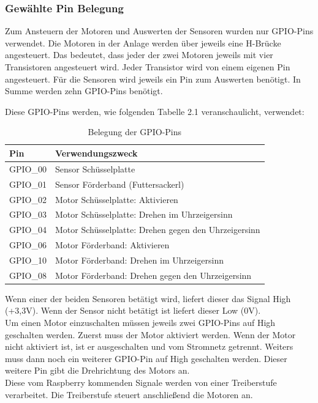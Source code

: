 \vspace{120pt}

\subsubsection{Gewählte Pin Belegung}
Zum Ansteuern der Motoren und Auswerten der Sensoren wurden nur GPIO-Pins verwendet. Die Motoren in der Anlage werden über jeweils eine H-Brücke angesteuert. Das bedeutet, dass jeder der zwei Motoren jeweils mit vier Transistoren angesteuert wird. Jeder Transistor wird von einem eigenen Pin angesteuert. Für die Sensoren wird jeweils ein Pin zum Auswerten benötigt. In Summe werden zehn GPIO-Pins benötigt. 

\newpage

Diese GPIO-Pins werden, wie folgenden Tabelle 2.1 veranschaulicht, verwendet:

\begin{table}[htb]
\centering
\begin{tabular}{|l|l|}
\hline
\textbf{Pin} & \textbf{Verwendungszweck}          \\ \hline
GPIO\_00     & Sensor Schüsselplatte              \\ \hline
GPIO\_01     & Sensor Förderband (Futtersackerl)  \\ \hline
GPIO\_02     & Motor Schüsselplatte: Aktivieren \\ \hline
GPIO\_03     & Motor Schüsselplatte: Drehen im Uhrzeigersinn \\ \hline
GPIO\_04     & Motor Schüsselplatte: Drehen gegen den Uhrzeigersinn \\ \hline
GPIO\_06     & Motor Förderband: Aktivieren     \\ \hline
GPIO\_10     & Motor Förderband: Drehen im Uhrzeigersinn     \\ \hline
GPIO\_08     & Motor Förderband: Drehen gegen den Uhrzeigersinn     \\ \hline
\end{tabular}
\caption{Belegung der GPIO-Pins}
\label{Pinbelegung}
\end{table}

Wenn einer der beiden Sensoren betätigt wird, liefert dieser das Signal High (+3,3V). Wenn der Sensor nicht betätigt ist liefert dieser Low (0V). 
\\ Um einen Motor einzuschalten müssen jeweils zwei GPIO-Pins auf High geschalten werden. Zuerst muss der Motor aktiviert werden. Wenn der Motor nicht aktiviert ist, ist er ausgeschalten und vom Stromnetz getrennt. Weiters muss dann noch ein weiterer GPIO-Pin auf High geschalten werden. Dieser weitere Pin gibt die Drehrichtung des Motors an.
\\ Diese vom Raspberry kommenden Signale werden von einer Treiberstufe verarbeitet. Die Treiberstufe steuert anschließend die Motoren an. 

